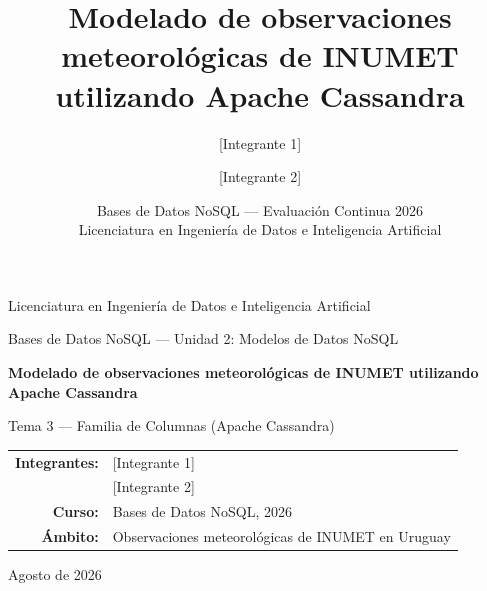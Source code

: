 \documentclass[11pt,a4paper]{article}
\title{\textbf{Modelado de observaciones meteorológicas de INUMET utilizando Apache Cassandra}}
\author{[Integrante 1] \and [Integrante 2]}
\date{Bases de Datos NoSQL --- Evaluación Continua 2026\\Licenciatura en Ingeniería de Datos e Inteligencia Artificial}
\begin{document}
\begin{titlepage}
    \centering
    {\Large Licenciatura en Ingeniería de Datos e Inteligencia Artificial\par}
    \vspace{0.5cm}
    {\large Bases de Datos NoSQL --- Unidad 2: Modelos de Datos NoSQL\par}
    \vspace{1.8cm}
    {\LARGE\bfseries Modelado de observaciones meteorológicas de INUMET utilizando Apache Cassandra\par}
    \vspace{1.2cm}
    {\large Tema 3 --- Familia de Columnas (Apache Cassandra)\par}
    \vfill
    \begin{tabular}{rl}
      \textbf{Integrantes:} & [Integrante 1] \\
                            & [Integrante 2] \\
      \textbf{Curso:} & Bases de Datos NoSQL, 2026 \\
      \textbf{Ámbito:} & Observaciones meteorológicas de INUMET en Uruguay \\
    \end{tabular}
    \vfill
    {\large Agosto de 2026\par}
\end{titlepage}

\tableofcontents
\clearpage








\clearpage
\printbibliography[title={Referencias}]
\end{document}
